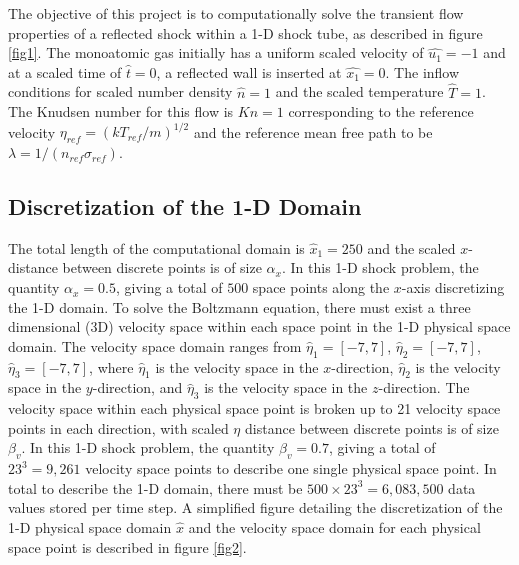 \documentclass[a4paper]{article}
\begin{document}
The objective of this project is to computationally solve the transient flow properties of a reflected shock within a 1-D shock tube, as described in figure \ref{fig1}. The monoatomic gas initially has a uniform scaled velocity of $\hat{u_1} = -1$ and at a scaled time of $\hat{t} = 0$, a reflected wall is inserted at $\hat{x_1} = 0$. The inflow conditions for scaled number density $\hat{n} = 1$ and the scaled temperature $\hat{T} = 1$. The Knudsen number for this flow is $Kn = 1$ corresponding to the reference velocity $\eta_{ref} = (kT_{ref}/m)^{1/2}$ and the reference mean free path to be $\lambda = 1/(n_{ref}\sigma_{ref})$.

\subsection{Discretization of the 1-D Domain}
The total length of the computational domain is $\hat{x}_1 = 250$ and the scaled $x$-distance between discrete points is of size $\alpha_x$. In this 1-D shock problem, the quantity $\alpha_x = 0.5$, giving a total of $500$ space points along the $x$-axis discretizing the 1-D domain. To solve the Boltzmann equation, there must exist a three dimensional (3D) velocity space within each space point in the 1-D physical space domain. The velocity space domain ranges from $\hat{\eta}_1 = [-7,7]$, $\hat{\eta}_2 = [-7,7]$, $\hat{\eta}_3 = [-7,7]$, where $\hat{\eta}_1$ is the velocity space in the $x$-direction, $\hat{\eta}_2$ is the velocity space in the $y$-direction, and $\hat{\eta}_3$ is the velocity space in the $z$-direction. The velocity space within each physical space point is broken up to 21 velocity space points in each direction, with scaled $\eta$ distance between discrete points is of size $\beta_v$. In this 1-D shock problem, the quantity $\beta_v = 0.7$, giving a total of $23^3 = 9,261$ velocity space points to describe one single physical space point. In total to describe the 1-D domain, there must be $500 \times 23^3 = 6,083,500$ data values stored per time step. A simplified figure detailing the discretization of the 1-D physical space domain $\hat{x}$ and the velocity space domain for each physical space point is described in figure \ref{fig2}.
\end{document}

